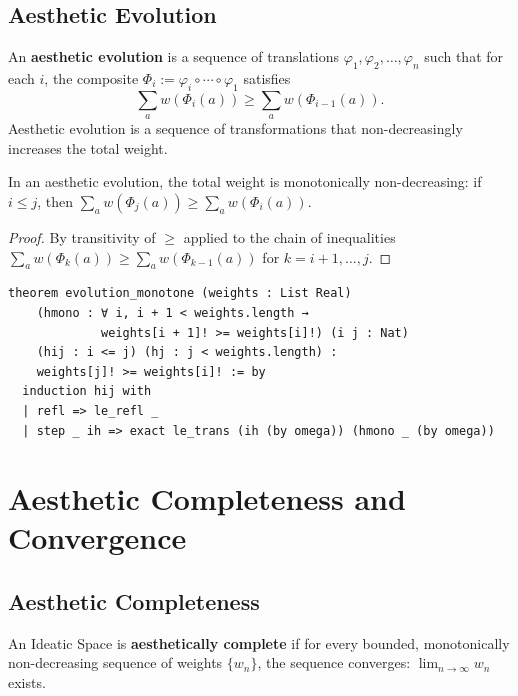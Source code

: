 \subsection{Aesthetic Evolution}

\begin{definition}
\label{def:aesthetic-evolution}
An \textbf{aesthetic evolution} is a sequence of translations
$\varphi_1, \varphi_2, \ldots, \varphi_n$ such that for each $i$,
the composite $\Phi_i := \varphi_i \circ \cdots \circ \varphi_1$
satisfies
\[
  \sum_{a} w(\Phi_i(a)) \geq \sum_{a} w(\Phi_{i-1}(a)).
\]
Aesthetic evolution is a sequence of transformations that
non-decreasingly increases the total weight.
\end{definition}

\begin{theorem}
\label{thm:evolution-mono}
In an aesthetic evolution, the total weight is monotonically
non-decreasing: if $i \leq j$, then
$\sum_a w(\Phi_j(a)) \geq \sum_a w(\Phi_i(a))$.
\end{theorem}

\begin{proof}
By transitivity of $\geq$ applied to the chain of inequalities
$\sum_a w(\Phi_k(a)) \geq \sum_a w(\Phi_{k-1}(a))$ for
$k = i+1, \ldots, j$.
\end{proof}

\begin{lstlisting}
theorem evolution_monotone (weights : List Real)
    (hmono : ∀ i, i + 1 < weights.length →
             weights[i + 1]! >= weights[i]!) (i j : Nat)
    (hij : i <= j) (hj : j < weights.length) :
    weights[j]! >= weights[i]! := by
  induction hij with
  | refl => le_refl _
  | step _ ih => exact le_trans (ih (by omega)) (hmono _ (by omega))
\end{lstlisting}

\section{Aesthetic Completeness and Convergence}
\label{sec:math-aesthetics:completeness}

\subsection{Aesthetic Completeness}

\begin{definition}
\label{def:aesthetically-complete}
An Ideatic Space is \textbf{aesthetically complete} if for every bounded,
monotonically non-decreasing sequence of weights $\{w_n\}$, the sequence
converges: $\lim_{n \to \infty} w_n$ exists.
\end{definition}

